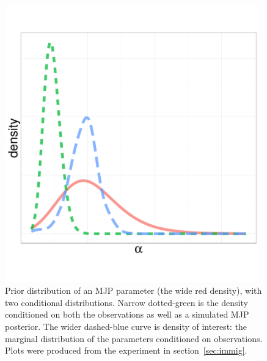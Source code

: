   \begin{figure}%
  \centering
  \begin{minipage}[hp]{0.35\linewidth}
  \centering
    \vspace{-0 in}
    \includegraphics [width=0.98\textwidth, angle=0]{figs/dist_beta.pdf}
  \end{minipage}
  \begin{minipage}[hp]{0.64\linewidth}
  \caption{Prior distribution of an MJP parameter (the wide red density),
  with two conditional distributions. Narrow dotted-green is the
density conditioned on both the observations as well as a simulated
MJP posterior. The wider dashed-blue curve is density of interest: the
marginal distribution of the parameters conditioned on observations. 
Plots were produced from the experiment in section~\ref{sec:immig}.}
     \label{fig:hist}
  \end{minipage}
  \end{figure}
